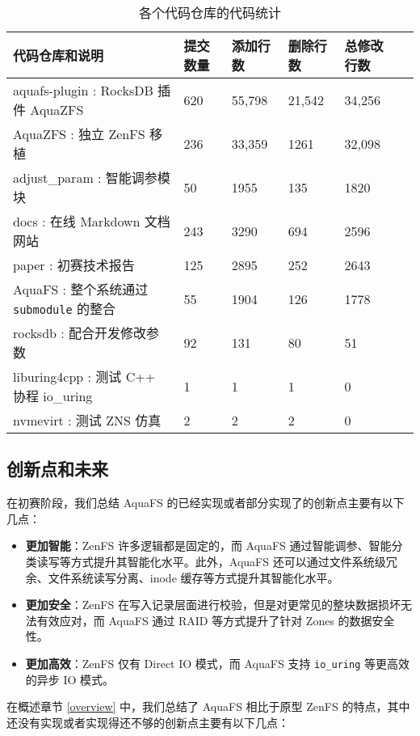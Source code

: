 \begin{table}[H]
  \centering
  \caption{各个代码仓库的代码统计}
  \label{tab:code-repo}
  \begin{tabular}{llllll}
  \hline
  \textbf{代码仓库和说明} & \textbf{提交数量} & \textbf{添加行数} & \textbf{删除行数} & \textbf{总修改行数} \\
  \hline
  aquafs-plugin  : RocksDB 插件 AquaZFS & 620 & 55,798 & 21,542 & 34,256 \\ 
  AquaZFS        : 独立 ZenFS 移植 & 236 & 33,359 & 1261 & 32,098 \\ 
  adjust\_param  : 智能调参模块 & 50 & 1955 & 135 & 1820 \\ 
  docs           : 在线 Markdown 文档网站 & 243 & 3290 & 694 & 2596 \\ 
  paper          : 初赛技术报告 & 125 & 2895 & 252 & 2643 \\ 
  AquaFS         : 整个系统通过 \verb|submodule| 的整合 & 55 & 1904 & 126 & 1778 \\ 
  rocksdb        : 配合开发修改参数 & 92 & 131 & 80 & 51 \\ 
  liburing4cpp   : 测试 C++ 协程 io\_uring & 1 & 1 & 1 & 0 \\ 
  nvmevirt       : 测试 ZNS 仿真 & 2 & 2 & 2 & 0 \\ 
  \end{tabular}
\end{table}

\subsection{创新点和未来}

在初赛阶段，我们总结 AquaFS 的已经实现或者部分实现了的创新点主要有以下几点：

\begin{itemize}
  \item \textbf{更加智能}：ZenFS 许多逻辑都是固定的，而 AquaFS 通过智能调参、智能分类读写等方式提升其智能化水平。此外，AquaFS 还可以通过文件系统级冗余、文件系统读写分离、inode 缓存等方式提升其智能化水平。
  \item \textbf{更加安全}：ZenFS 在写入记录层面进行校验，但是对更常见的整块数据损坏无法有效应对，而 AquaFS 通过 RAID 等方式提升了针对 Zones 的数据安全性。
  \item \textbf{更加高效}：ZenFS 仅有 Direct IO 模式，而 AquaFS 支持 \verb|io_uring| 等更高效的异步 IO 模式。
\end{itemize}

在概述章节 \ref{overview} 中，我们总结了 AquaFS 相比于原型 ZenFS 的特点，其中还没有实现或者实现得还不够的创新点主要有以下几点：

